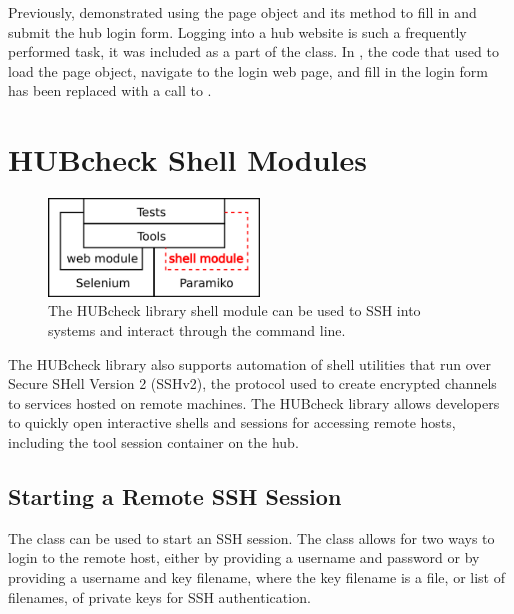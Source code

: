 Previously,  demonstrated using the
 page object and its  method to fill
in and submit the hub login form. Logging into a hub website is such a
frequently performed task, it was included as a part of the 
class. In , the code that used to load
the  page object, navigate to the login web page, and fill
in the login form has been replaced with a call to
.


\section{HUBcheck Shell Modules}
\label{sec:hubcheck_shell_modules}

\begin{figure}[tbh]
  \centering
  \includegraphics[width=0.5\textwidth]
    {../../images/hubcheck_block_diagram/hubcheck_library_overview_shell_module.png}
  \caption{ The HUBcheck library shell module can be used to SSH into systems and interact through the command line. }
  \label{fig:hubzero_library_overview_shell_module}
\end{figure}

The HUBcheck library also supports automation of shell utilities that run over
Secure SHell Version 2 (SSHv2), the protocol used to create encrypted channels
to services hosted on remote machines. The HUBcheck library allows developers
to quickly open interactive shells and  sessions for
accessing remote hosts, including the tool session container on the hub.

\subsection{Starting a Remote SSH Session}
\label{ssec:starting_remote_ssh_session}

The  class can be used to start an SSH session. The
class allows for two ways to login to the remote host, either by providing a
username and password or by providing a username and key filename, where the
key filename is a file, or list of filenames, of private keys for SSH
authentication.


